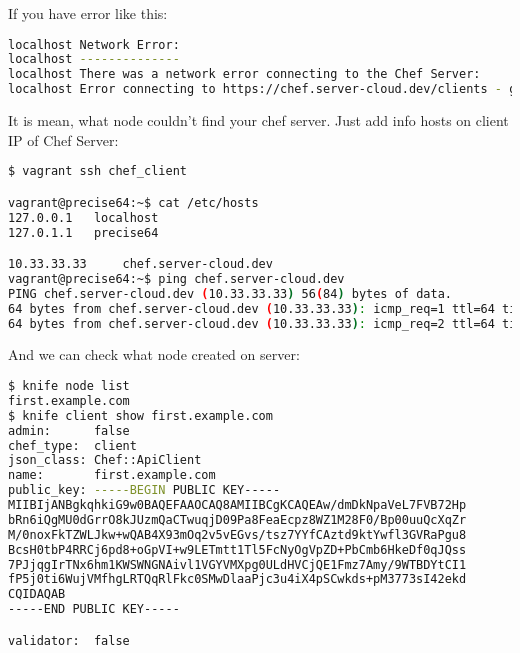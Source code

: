 If you have error like this:

\begin{lstlisting}[language=Bash,label=lst:my-server-cloud-node4]
localhost Network Error:
localhost --------------
localhost There was a network error connecting to the Chef Server:
localhost Error connecting to https://chef.server-cloud.dev/clients - getaddrinfo: Name or service not known
\end{lstlisting}

It is mean, what node couldn't find your chef server. Just add info hosts on client IP of Chef Server:

\begin{lstlisting}[language=Bash,label=lst:my-server-cloud-node5]
$ vagrant ssh chef_client

vagrant@precise64:~$ cat /etc/hosts
127.0.0.1	localhost
127.0.1.1	precise64

10.33.33.33		chef.server-cloud.dev
vagrant@precise64:~$ ping chef.server-cloud.dev
PING chef.server-cloud.dev (10.33.33.33) 56(84) bytes of data.
64 bytes from chef.server-cloud.dev (10.33.33.33): icmp_req=1 ttl=64 time=0.623 ms
64 bytes from chef.server-cloud.dev (10.33.33.33): icmp_req=2 ttl=64 time=0.466 ms
\end{lstlisting}

And we can check what node created on server:

\begin{lstlisting}[language=Bash,label=lst:my-server-cloud-node6]
$ knife node list
first.example.com
$ knife client show first.example.com
admin:      false
chef_type:  client
json_class: Chef::ApiClient
name:       first.example.com
public_key: -----BEGIN PUBLIC KEY-----
MIIBIjANBgkqhkiG9w0BAQEFAAOCAQ8AMIIBCgKCAQEAw/dmDkNpaVeL7FVB72Hp
bRn6iQgMU0dGrrO8kJUzmQaCTwuqjD09Pa8FeaEcpz8WZ1M28F0/Bp00uuQcXqZr
M/0noxFkTZWLJkw+wQAB4X93mOq2v5vEGvs/tsz7YYfCAztd9ktYwfl3GVRaPgu8
BcsH0tbP4RRCj6pd8+oGpVI+w9LETmtt1Tl5FcNyOgVpZD+PbCmb6HkeDf0qJQss
7PJjqgIrTNx6hm1KWSWNGNAivl1VGYVMXpg0ULdHVCjQE1Fmz7Amy/9WTBDYtCI1
fP5j0ti6WujVMfhgLRTQqRlFkc0SMwDlaaPjc3u4iX4pSCwkds+pM3773sI42ekd
CQIDAQAB
-----END PUBLIC KEY-----

validator:  false
\end{lstlisting}